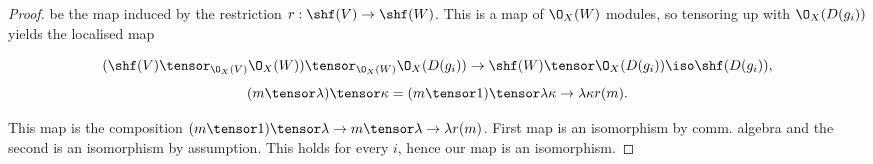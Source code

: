 \begin{proof}
be the map induced by the restriction $r:\shf(V) \rightarrow \shf(W)$.
This is a map of $\O_X(W)$ modules, so tensoring up with $\O_X(D(g_i))$ yields the localised map

\[(\shf(V)\tensor_{\O_X(V)}  \O_X(W)) \tensor_{\O_X(W)} \O_X(D(g_i)) \rightarrow \shf(W) \tensor \O_X(D(g_i)) \iso \shf(D(g_i)),\]
\[(m \tensor \lambda)\tensor \kappa = (m\tensor 1) \tensor \lambda \kappa \to \lambda \kappa r(m).\]

This map is the composition  $(m\tensor 1) \tensor \lambda \rightarrow m\tensor \lambda \rightarrow \lambda r(m)$.
First map is an isomorphism by comm. algebra and the second is an isomorphism by assumption.
This holds for every $i$, hence our map is an isomorphism.
\end{proof}